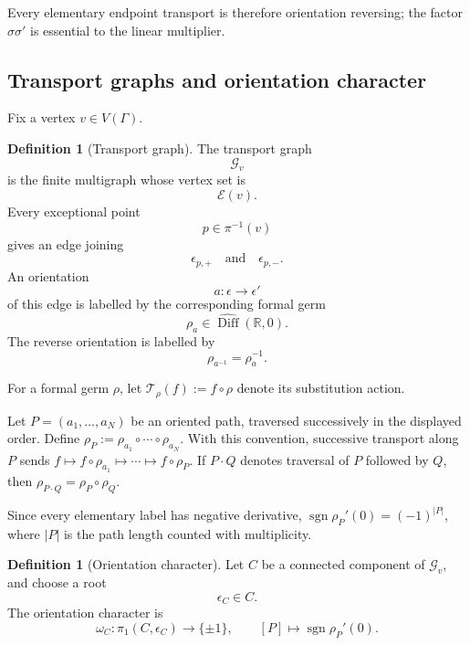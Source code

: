 \documentclass[11pt]{article}
\theoremstyle{plain}
\theoremstyle{definition}
\newtheorem{definition}[theorem]{Definition}
\begin{document}
Every elementary endpoint transport is therefore orientation reversing; the factor \(\sigma\sigma'\) is essential to the linear multiplier.

\subsection{Transport graphs and orientation character}
\label{subsec:transport-graphs}

Fix a vertex
\(v\in V(\Gamma)\).

\begin{definition}[Transport graph]
\label{def:transport-graph}
The transport graph
\[
  \mathcal G_v
\]
is the finite multigraph whose vertex set is
\[
  \mathcal E(v).
\]
Every exceptional point
\[
  p\in\pi^{-1}(v)
\]
gives an edge joining
\[
  \epsilon_{p,+}
  \quad\text{and}\quad
  \epsilon_{p,-}.
\]
An orientation
\[
  a:\epsilon\longrightarrow\epsilon'
\]
of this edge is labelled by the corresponding formal germ
\[
  \rho_a
  \in
  \widehat{\operatorname{Diff}}(\mathbb R,0).
\]
The reverse orientation is labelled by
\[
  \rho_{a^{-1}}=\rho_a^{-1}.
\]
\end{definition}

For a formal germ \(\rho\), let \(\mathcal T_\rho(f):=f\circ\rho\) denote its substitution action.

Let \(P=(a_1,\ldots,a_N)\) be an oriented path, traversed successively in the displayed order.
Define
\(\rho_P := \rho_{a_1} \circ\cdots\circ \rho_{a_N}\).
With this convention, successive transport along \(P\) sends
\(f \longmapsto f\circ\rho_{a_1} \longmapsto \cdots \longmapsto f\circ\rho_P\).
If \(P\cdot Q\) denotes traversal of \(P\) followed by \(Q\), then
\(\rho_{P\cdot Q} = \rho_P\circ\rho_Q\).

Since every elementary label has negative derivative,
\(\operatorname{sgn}\rho_P'(0) = (-1)^{|P|}\),
where \(|P|\) is the path length counted with multiplicity.

\begin{definition}[Orientation character]
\label{def:orientation-character}
Let \(C\) be a connected component of \(\mathcal G_v\), and choose a
root
\[
  \epsilon_C\in C.
\]
The orientation character is
\[
  \omega_C:
  \pi_1(C,\epsilon_C)
  \longrightarrow
  \{\pm1\},
  \qquad
  [P]\longmapsto
  \operatorname{sgn}\rho_P'(0).
\]
\end{definition}
\end{document}
